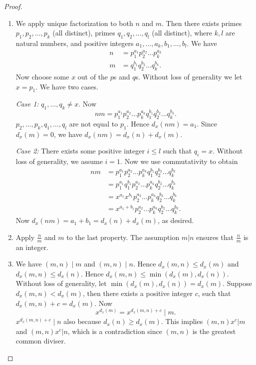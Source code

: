 \begin{enumerate}
\begin{proof}
\begin{enumerate}
Now assume $x^a | n$ and we want to show $d_x(n) \ge  a$. Since $p_2^{a_2}, \ldots, p_k^{a_k}$ are all prime factors other than $x$, we have \[
	x^a \mid p_1^{a_1}
.\] 
Hence $x^{a_1} \ge  x^a$. Since $x>0$, we have $d_x(n) = a_1\ge a$, as desired.
			\item We apply unique factorization to both $n$ and $m$. Then there exists primes  $p_1, p_2,\ldots,p_k$ (all distinct), primes $q_1,q_2,\ldots,q_l$ (all distinct), where $k, l$ are natural numbers, and positive integers $a_1, \ldots,a_k, b_1, \ldots,b_l$. We have
\begin{align*}
	n &= p_1^{a_1}p_2^{a_2}\ldots p_k^{a_k} \\
	m &= q_1^{b_1}q_2^{b_2}\ldots q_k^{b_k}
.\end{align*}
Now choose some  $x$ out of the  $p$s and  $q$s. Without loss of generality we let  $x = p_1$. We have two cases.

\textit{Case 1:} $q_1, \ldots, q_k \neq  x$. Now
\[
	nm = p_1^{a_1}p_2^{a_2}\ldots p_k^{a_k}q_1^{b_1}q_2^{b_2}\ldots q_k^{b_k}
.\] 
$p_2, \ldots, p_k, q_1, \ldots, q_l$ are not equal to $p_1$. Hence $d_x(nm) = a_1$. Since $d_x(m) = 0$, we have $d_x(nm) = d_x(n) + d_x(m)$.

\textit{Case 2:} There exists some positive integer $i\le l$ such that $q_i = x$. Without loss of generality, we assume $i = 1$. Now we use commutativity to obtain
\begin{align*}
	nm &= p_1^{a_1}p_2^{a_2}\ldots p_k^{a_k}q_1^{b_1}q_2^{b_2}\ldots q_k^{b_k}\\
	&= p_1^{a_1}q_1^{b_1}p_2^{a_2}\ldots p_k^{a_k}q_2^{b_2}\ldots q_k^{b_k}\\
	&= x^{a_1}x^{b_1}p_2^{a_2}\ldots p_k^{a_k}q_2^{b_2}\ldots q_k^{b_k}\\
	&= x^{a_1+b_1}p_2^{a_2}\ldots p_k^{a_k}q_2^{b_2}\ldots q_k^{b_k}
.\end{align*}
Now $d_x(nm) = a_1 + b_1 = d_x(n) + d_x(m)$, as desired.
			\item Apply $\frac{n}{m}$ and $m$ to the last property. The assumption $m | n$ ensures that $\frac{n}{m}$ is an integer.
			\item We have  $(m,n) \mid m$ and $(m,n) \mid n$. Hence $d_x(m,n)\le d_x(m)$ and $d_x(m,n) \le d_x(n)$. Hence $d_x(m,n) \le \min(d_x(m), d_x(n))$. Without loss of generality, let $\min(d_x(m), d_x(n)) = d_x(m)$. Suppose $d_x(m,n) < d_x(m)$, then there exists a positive integer $c$, such that $d_x(m,n) + c =  d_x(m)$. Now \[
					x^{d_x(m)} = x^{d_x(m,n) + c}\mid m
			.\] 
$x^{d_x(m,n) + c}\mid  n$ also because  $d_x(n)\ge d_x(m)$.
			This implies $(m,n)x^c | m$ and $(m,n)x^c | n$, which is a contradiction since $(m,n)$ is the greatest common diviser.


\end{enumerate}
\end{proof}
\end{enumerate}

